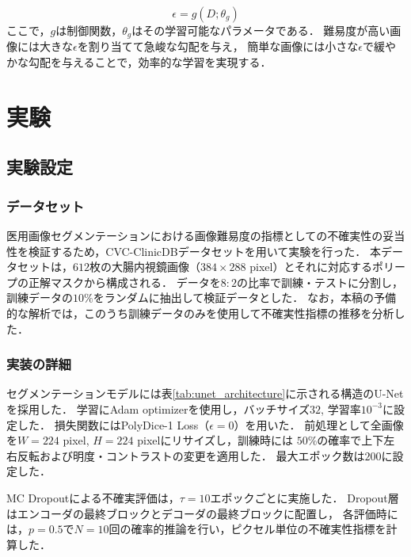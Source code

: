 \documentclass[10pt, a4paper, twocolumn]{jarticle}
\begin{document}
\begin{equation}
  \epsilon = g(D; \theta_g)
\end{equation}
ここで，$g$は制御関数，$\theta_g$はその学習可能なパラメータである．
難易度が高い画像には大きな$\epsilon$を割り当てて急峻な勾配を与え，
簡単な画像には小さな$\epsilon$で緩やかな勾配を与えることで，効率的な学習を実現する．

\section{実験}
\subsection{実験設定}
\subsubsection{データセット}
医用画像セグメンテーションにおける画像難易度の指標としての不確実性の妥当性を検証するため，CVC-ClinicDB\cite{BERNAL201599}データセットを用いて実験を行った．
本データセットは，$612$枚の大腸内視鏡画像（$384 \times 288$ pixel）とそれに対応するポリープの正解マスクから構成される．
データを$8:2$の比率で訓練・テストに分割し，訓練データの$10 \%$をランダムに抽出して検証データとした．
なお，本稿の予備的な解析では，このうち訓練データのみを使用して不確実性指標の推移を分析した．

\subsubsection{実装の詳細}
セグメンテーションモデルには表\ref{tab:unet_architecture}に示される構造のU-Net\cite{ronneberger2015u}を採用した．
学習にAdam optimizer\cite{kingma2014adam}を使用し，バッチサイズ$32$, 学習率$10 ^ {-3}$に設定した．
損失関数にはPolyDice-1 Loss（$\epsilon = 0$）を用いた．
前処理として全画像を$W = 224$ pixel, $H = 224$ pixelにリサイズし，訓練時には
$50\%$の確率で上下左右反転および明度・コントラストの変更を適用した．
最大エポック数は$200$に設定した．

MC Dropoutによる不確実評価は，$\tau=10$エポックごとに実施した．
Dropout層はエンコーダの最終ブロックとデコーダの最終ブロックに配置し，
各評価時には，$p = 0.5$で$N = 10$回の確率的推論を行い，ピクセル単位の不確実性指標を計算した．
\end{document}
